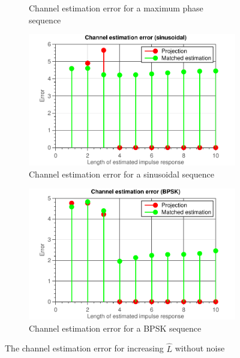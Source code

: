 \documentclass[11pt,titlepage]{report}
\begin{document}
\begin{figure}[H]
\begin{subfigure}{0.49\textwidth}
		\caption{\centering Channel estimation error for a maximum phase sequence}
	\end{subfigure}
	\begin{subfigure}{0.49\textwidth}
		\includegraphics[width=\textwidth]{../../deliverable-7-resources/figures/ass-1/report-8-9-10/report-9-no-noise/ass-1-report-9-sinusoidal.pdf}
		\caption{\centering Channel estimation error for a sinusoidal sequence}
	\end{subfigure}
	\begin{subfigure}{0.49\textwidth}
		\includegraphics[width=\textwidth]{../../deliverable-7-resources/figures/ass-1/report-8-9-10/report-9-no-noise/ass-1-report-9-BPSK.pdf}
		\caption{\centering Channel estimation error for a BPSK sequence}
	\end{subfigure}
	\caption{The channel estimation error for increasing $\hat{L}$ without noise}
	\label{fig:ass-1-rep-9-no-noise}
\end{figure}
\end{document}

